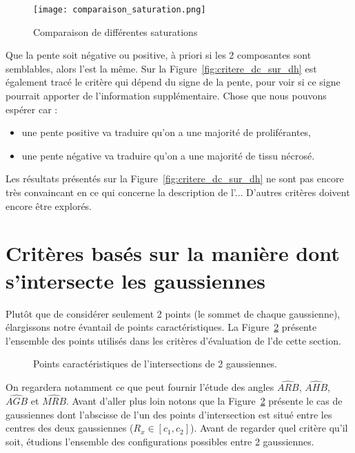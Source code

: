 \documentclass[main.tex]{subfiles}
\begin{document}
\begin{figure}
\centering
\texttt{[image: comparaison\_saturation.png]}
\caption{\label{fig:comp_saturation}Comparaison de différentes saturations}
\end{figure}

Que la pente soit négative ou positive, à priori si les 2 composantes sont semblables, alors l'\hetero est la même. Sur la Figure~\ref{fig:critere_dc_sur_dh} est également tracé le critère qui dépend du signe de la pente, pour voir si ce signe pourrait apporter de l'information supplémentaire. Chose que nous pouvons espérer car :
\begin{itemize}
\item une pente positive va traduire qu'on a une majorité de proliférantes,
\item une pente négative va traduire qu'on a une majorité de tissu nécrosé.
\end{itemize}

Les résultats présentés sur la Figure~\ref{fig:critere_dc_sur_dh} ne sont pas encore très convaincant en ce qui concerne la description de l'\hetero... D'autres critères doivent encore être explorés.

\section{Critères basés sur la manière dont s'intersecte les gaussiennes}
Plutôt que de considérer seulement 2 points (le sommet de chaque gaussienne), élargissons notre évantail de points caractéristiques. La Figure~\ref{fig:pts_carac_intersection_gaussienne} présente l'ensemble des points utilisés dans les critères d'évaluation de l'\hetero de cette section.

\begin{figure}
\qquad
{}
\caption{\label{fig:pts_carac_intersection_gaussienne}Points caractéristiques de l'intersections de 2 gaussiennes.}
\end{figure}

On regardera notamment ce que peut fournir l'étude des angles $\widehat{ARB}$,  $\widehat{AHB}$, $\widehat{AGB}$ et $\widehat{MRB}$. Avant d'aller plus loin notons que la Figure~\ref{fig:pts_carac_intersection_gaussienne} présente le cas de gaussiennes dont l'abscisse de l'un des points d'intersection est situé entre les centres des deux gaussiennes ($R_x\in[c_1,c_2]$). Avant de regarder quel critère qu'il soit, étudions l'ensemble des configurations possibles entre 2 gaussiennes.
\end{document}
